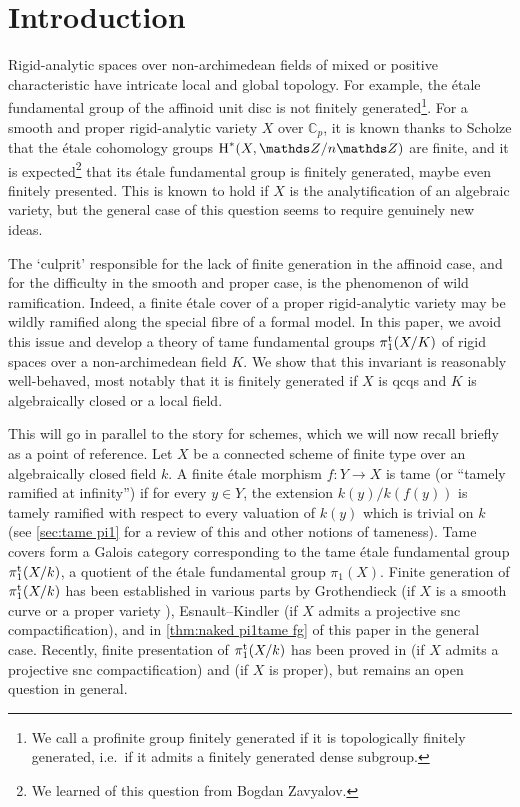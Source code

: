 \section{Introduction}
\label{s:intro}

Rigid-analytic spaces over non-archimedean fields of mixed or positive characteristic have intricate local and global topology. For example, the \'etale fundamental group of the affinoid unit disc is not finitely generated\footnote{We call a profinite group finitely generated if it is topologically finitely generated, i.e.\ if it admits a finitely generated dense subgroup.}. For a smooth and proper rigid-analytic variety $X$ over $\mathbb{C}_p$, it is known thanks to Scholze \cite{Scholze} that the \'etale cohomology groups $\rH^*(X,\bZ/n\bZ)$ are finite, and it is expected\footnote{We learned of this question from Bogdan Zavyalov.} that its \'etale fundamental group is finitely generated, maybe even finitely presented. This is known to hold if $X$ is the analytification of an algebraic variety, but the general case of this question seems to require genuinely new ideas. 

The `culprit' responsible for the lack of finite generation in the affinoid case, and for the difficulty in the smooth and proper case, is the phenomenon of wild ramification. 
Indeed, a finite \'etale cover of a proper rigid-analytic variety may be wildly ramified along the special fibre of a formal model.
In this paper, we avoid this issue and develop a theory of tame fundamental groups $\pi_1^{\mathrm{t}}(X/K)$ of rigid spaces over a non-archimedean field $K$. We show that this invariant is reasonably well-behaved, most notably that it is finitely generated if $X$ is qcqs and $K$ is algebraically closed or a local field.

This will go in parallel to the story for schemes, which we will now recall briefly as a point of reference. Let $X$ be a connected scheme of finite type over an algebraically closed field $k$. A finite \'etale morphism $f\colon Y\to X$ is tame (or ``tamely ramified at infinity'') if for every $y\in Y$, the extension $k(y)/k(f(y))$ is tamely ramified with respect to every valuation of $k(y)$ which is trivial on $k$ (see \cref{sec:tame pi1} for a review of this and other notions of tameness). Tame covers form a Galois category corresponding to the tame \'etale fundamental group $\pi_1^{\mathrm{t}}(X/k)$, a quotient of the \'etale fundamental group $\pi_1(X)$. Finite generation of $\pi_1^{\mathrm{t}}(X/k)$ has been established in various parts by Grothendieck (if $X$ is a smooth curve \cite[XIII, Corollaire 2.12]{SGA1} or a proper variety \cite[X, Th\'eor\`eme 2.9]{SGA1}), Esnault--Kindler \cite{EsnaultKindler2016:LefschetzTheoremsTamely} (if $X$ admits a projective snc compactification), and in \cref{thm:naked pi1tame fg} of this paper in the general case. Recently, finite presentation of $\pi_1^{\mathrm{t}}(X/k)$ has been proved in \cite{EsnaultShustermanSrinivas2022:FinitePresentationTame} (if $X$ admits a projective snc compactification) and  \cite{LaraSrinivasStix2024:FundamentalGroupsProper} (if $X$ is proper), but remains an open question in general.

